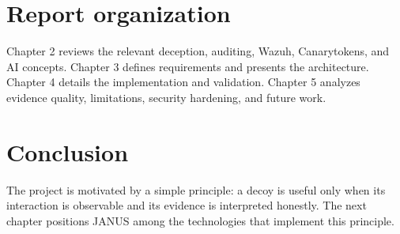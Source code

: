 \section{Report organization}

Chapter 2 reviews the relevant deception, auditing, Wazuh, Canarytokens, and AI
concepts. Chapter 3 defines requirements and presents the architecture. Chapter
4 details the implementation and validation. Chapter 5 analyzes evidence
quality, limitations, security hardening, and future work.

\section{Conclusion}

The project is motivated by a simple principle: a decoy is useful only when its
interaction is observable and its evidence is interpreted honestly. The next
chapter positions JANUS among the technologies that implement this principle.

